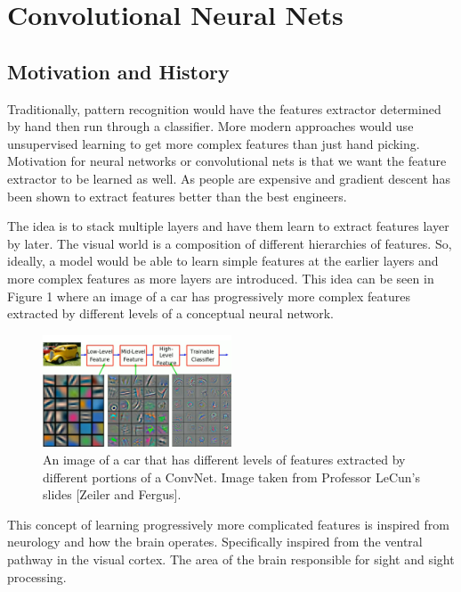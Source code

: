 \chapter{Convolutional Neural Nets}

\section{Motivation and History}

Traditionally, pattern recognition would have the features extractor determined by hand then run through a classifier.
More modern approaches would use unsupervised learning to get more complex features than just hand picking.
Motivation for neural networks or convolutional nets is that we want the feature extractor to be learned as well.
As people are expensive and gradient descent has been shown to extract features better than the best engineers.

The idea is to stack multiple layers and have them learn to extract features layer by later.
The visual world is a composition of different hierarchies of features.
So, ideally, a model would be able to learn simple features at the earlier layers and more complex features 
as more layers are introduced.
This idea can be seen in Figure 1 where an image of a car has progressively more complex features extracted by different
levels of a conceptual neural network.

\begin{figure}[ht]
\centering
\includegraphics[width=0.5\textwidth]{figs/FeatureExtraction.png}
\caption{An image of a car that has different levels of features extracted by different portions of a ConvNet.
Image taken from Professor LeCun's slides [Zeiler and Fergus].}
\end{figure}

This concept of learning progressively more complicated features is inspired from neurology and how the brain operates.
Specifically inspired from the ventral pathway in the visual cortex.
The area of the brain responsible for sight and sight processing.

